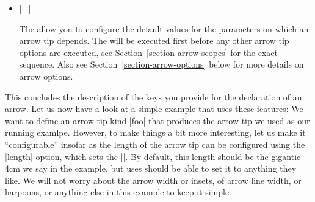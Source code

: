 \begin{command}{\pgfdeclarearrow{}}
\begin{itemize}
  \item {}|=|

    The  allow you to configure the default values
    for the parameters on which an arrow tip depends. The  will be executed first before any other arrow tip options
    are executed, see Section~\ref{section-arrow-scopes} for the exact
    sequence. Also see Section~\ref{section-arrow-options} below for
    more details on arrow options.
  \end{itemize}

  This concludes the description of the keys you provide for the
  declaration of an arrow. Let us now have a look at a simple example
  that uses these features: We want to define an arrow tip kind |foo|
  that produces the arrow tip we used as our running examlpe. However,
  to make things a bit more interesting, let us make it
  ``configurable'' insofar as the length of the arrow tip can be
  configured using the |length| option, which sets the
  |\pgfarrowlength|. By default, this length should be the gigantic
  4cm we say in the example, but uses should be able to set it to
  anything they like. We will not worry about the arrow width or
  insets, of arrow line width, or harpoons, or anything else in this
  example to keep it simple.


\end{command}
